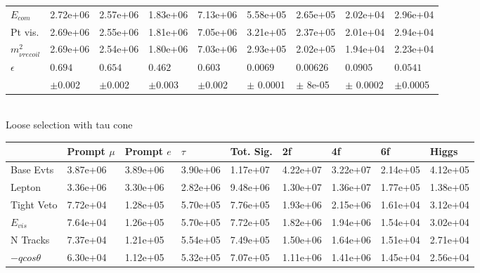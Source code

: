 \begin{table}
\begin{tabular}{|p{}|p{}p{}p{}p{}p{}p{}p{}p{}|}
$E_{com}$ & {2.72e+06 } &  {2.57e+06 } &  {1.83e+06} & {7.13e+06} &  {5.58e+05} &  {2.65e+05} &  {2.02e+04} &  {2.96e+04} \\ 

Pt vis. & {2.69e+06 } &  {2.55e+06 } &  {1.81e+06} & {7.05e+06} &  {3.21e+05} &  {2.37e+05} &  {2.01e+04} &  {2.94e+04} \\ 

$m^2_{\nu recoil}$ & {2.69e+06 } &  {2.54e+06 } &  {1.80e+06} & {7.03e+06} &  {2.93e+05} &  {2.02e+05} &  {1.94e+04} &  {2.23e+04} \\ 
\hline 

 $\epsilon$ & $0.694 $ & $0.654 $ & $0.462$ &  $0.603 $ & $0.0069 $ & $0.00626 $ & $0.0905 $ & $0.0541 $ \\ 
 
 			& $\pm$0.002 & $\pm$0.002 & $\pm$0.003 & $\pm$0.002 & $\pm$ 0.0001 & $\pm$ {8e-05} & $\pm$ 0.0002 & $\pm$0.0005 \\
\hline
\end{tabular}
\quad \quad \\
Loose selection with tau cone\\
\begin{tabular}{|p{}|p{}p{}p{}p{}p{}p{}p{}p{}|}
\hline 
   & Prompt $\mu$ & Prompt $e$ & $\tau$ & Tot. Sig. & 2f & 4f & 6f & Higgs \\ \hline 
Base Evts & {3.87e+06 } &  {3.89e+06 } &  {3.90e+06} & {1.17e+07} &  {4.22e+07} &  {3.22e+07} &  {2.14e+05} &  {4.12e+05} \\ 
 
Lepton & {3.36e+06 } &  {3.30e+06 } &  {2.82e+06} & {9.48e+06} &  {1.30e+07} &  {1.36e+07} &  {1.77e+05} &  {1.38e+05} \\ 

Tight Veto & {7.72e+04 } &  {1.28e+05 } &  {5.70e+05} & {7.76e+05} &  {1.93e+06} &  {2.15e+06} &  {1.61e+04} &  {3.12e+04} \\ 
 
$E_{vis}$ & {7.64e+04 } &  {1.26e+05 } &  {5.70e+05} & {7.72e+05} &  {1.82e+06} &  {1.94e+06} &  {1.54e+04} &  {3.02e+04} \\ 

N Tracks & {7.37e+04 } &  {1.21e+05 } &  {5.54e+05} & {7.49e+05} &  {1.50e+06} &  {1.64e+06} &  {1.51e+04} &  {2.71e+04} \\ 
 
$-qcos\theta$ & {6.30e+04 } &  {1.12e+05 } &  {5.32e+05} & {7.07e+05} &  {1.11e+06} &  {1.41e+06} &  {1.45e+04} &  {2.56e+04} \\ 
 

\end{tabular}
\end{table}
